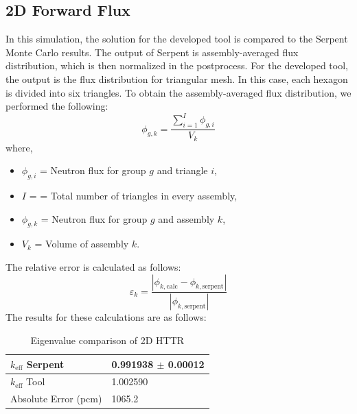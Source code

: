 \subsection{2D Forward Flux}

In this simulation, the solution for the developed tool is compared to the Serpent Monte Carlo results. The output of Serpent is assembly-averaged flux distribution, which is then normalized in the postprocess. For the developed tool, the output is the flux distribution for triangular mesh. In this case, each hexagon is divided into six triangles. To obtain the assembly-averaged flux distribution, we performed the following:
\begin{equation}
    \phi_{g,k} = \frac{\sum_{i=1}^I \phi_{g,i}}{V_k}
\end{equation}
where,
\begin{itemize}
    \item[] $\phi_{g,i}$ = Neutron flux for group $g$ and triangle $i$,
    \item[] $I$ = = Total number of triangles in every assembly, 
    \item[] $\phi_{g,k}$ = Neutron flux for group $g$ and assembly $k$, 
    \item[] $V_k$ = Volume of assembly $k$. 
\end{itemize}

The relative error is calculated as follows:
\begin{equation}\label{eq:error_serpent}
    \varepsilon_k = \frac{|\phi_{k,\text{calc}}-\phi_{k,\text{serpent}}|}{|\phi_{k,\text{serpent}}|}
\end{equation}
The results for these calculations are as follows:
\begin{table}[H]
        \centering
        \caption{Eigenvalue comparison of 2D HTTR}
        \label{table:2DHTTR_fw_results}
        \begin{tabular}{ | M{3.5cm} | M{4cm} | } 
         \hline
         $k_{\text{eff}}$ Serpent & 0.991938 $\pm$ 0.00012  \\
         \hline
         $k_{\text{eff}}$ Tool & 1.002590  \\
         \hline
         Absolute Error (pcm) & 1065.2  \\
         \hline
        \end{tabular}
\end{table}

